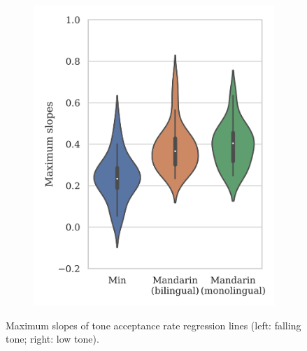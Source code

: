 \documentclass[12pt]{report}
\begin{document}
\begin{CJK}{UTF8}{bsmi}
\begin{figure}[hbt!]
\begin{subfigure}[b]{.49\textwidth}
\includegraphics[width=\textwidth]{Figures/E3/Result_21.png}
\end{subfigure}

\caption{Maximum slopes of tone acceptance rate regression lines (left: falling tone; right: low tone).}
\label{Figure:E3BoxPlot}
\end{figure}


\end{CJK}
\end{document}
